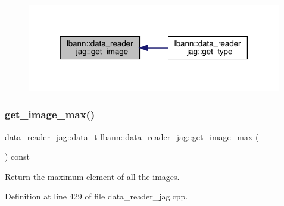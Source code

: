 \begin{figure}[H]
\begin{center}
\leavevmode
\includegraphics[width=316pt]{classlbann_1_1data__reader__jag_aee6e15cf6eda3bc97d1f7b077d74747a_icgraph}
\end{center}
\end{figure}
\mbox{\label{classlbann_1_1data__reader__jag_abf4e3248e1f319202d0bb370316f0d8a}} 
\subsubsection{\texorpdfstring{get\+\_\+image\+\_\+max()}{get\_image\_max()}}
{\footnotesize\ttfamily \hyperlink{classlbann_1_1data__reader__jag_a7377d6c02c455f019a378489b9b8eab4}{data\+\_\+reader\+\_\+jag\+::data\+\_\+t} lbann\+::data\+\_\+reader\+\_\+jag\+::get\+\_\+image\+\_\+max (\begin{DoxyParamCaption}{ }\end{DoxyParamCaption}) const\hspace{0.3cm}{\ttfamily [protected]}}



Return the maximum element of all the images. 



Definition at line 429 of file data\+\_\+reader\+\_\+jag.\+cpp.


